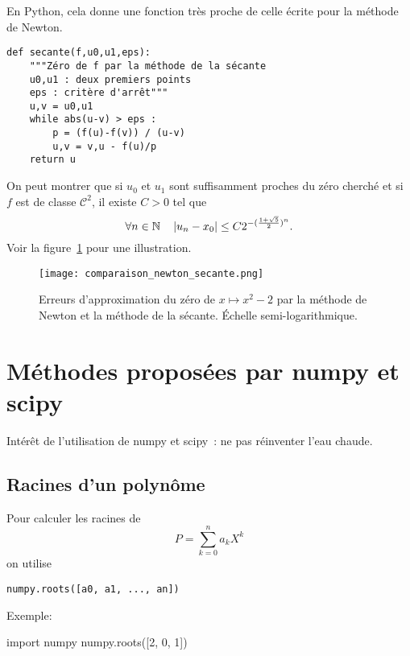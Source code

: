 \begin{center}
\resizebox{0.6\textwidth}{!}{}
\end{center}

En Python, cela donne une fonction très proche de celle écrite pour la méthode de Newton. 
\begin{lstlisting}
def secante(f,u0,u1,eps):
    """Zéro de f par la méthode de la sécante
    u0,u1 : deux premiers points
    eps : critère d'arrêt"""
    u,v = u0,u1
    while abs(u-v) > eps : 
        p = (f(u)-f(v)) / (u-v)
        u,v = v,u - f(u)/p
    return u
\end{lstlisting}


On peut montrer que si $u_{0}$ et $u_{1}$ sont suffisamment proches du
zéro cherché et si $f$ est de classe $\mathcal{C}^{2}$, il existe $C>0$ tel que
\begin{equation*}
  \forall n\in\mathbb{N}\quad \left|u_{n} - x_{0}\right| \leq C 2^{-(\frac{1+\sqrt5}2)^{n}}.
\end{equation*}
Voir la figure~\ref{12resolution-eq:fig:comp_sec_newton} pour une illustration.




\begin{figure}[!h]
\begin{center}
  \texttt{[image: comparaison\_newton\_secante.png]}
  \caption{Erreurs d'approximation du zéro de $x\mapsto x^2-2$ par la méthode de Newton et la méthode de la sécante. Échelle semi-logarithmique.}
  \label{12resolution-eq:fig:comp_sec_newton}
\end{center}
\end{figure}

\section{Méthodes proposées par numpy et scipy}
Intérêt de l'utilisation de numpy et scipy~: ne pas réinventer l'eau
chaude.
\subsection{Racines d'un polynôme}
Pour calculer les racines de
\begin{equation*}
 P = \sum_{k=0}^{n}a_{k}X^{k}
\end{equation*}
on utilise
\begin{lstlisting}
numpy.roots([a0, a1, ..., an])
\end{lstlisting}
Exemple:
\begin{pyconsole}
import numpy
numpy.roots([2, 0, 1])
\end{pyconsole}

